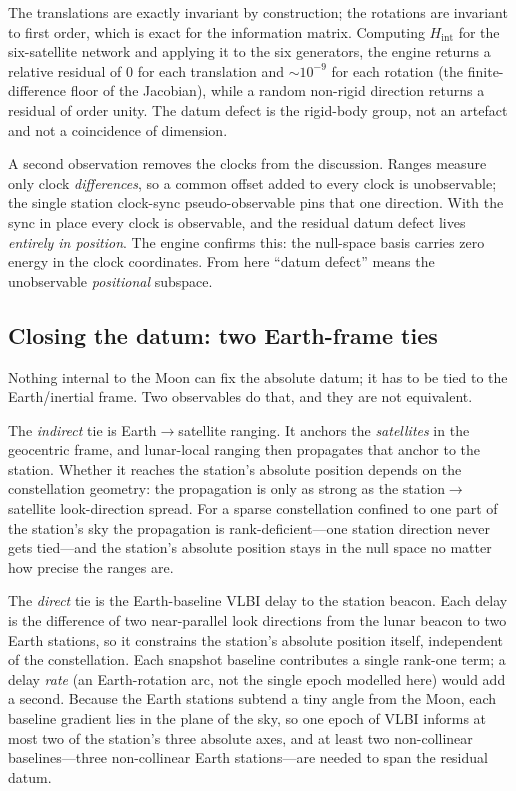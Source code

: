 The translations are exactly invariant by construction; the rotations are invariant
to first order, which is exact for the information matrix. Computing
$H_{\mathrm{int}}$ for the six-satellite network and applying it to the six
generators, the engine returns a relative residual of $0$ for each translation and
$\sim\!10^{-9}$ for each rotation (the finite-difference floor of the Jacobian),
while a random non-rigid direction returns a residual of order unity. The datum
defect is the rigid-body group, not an artefact and not a coincidence of
dimension.

A second observation removes the clocks from the discussion. Ranges measure only
clock \emph{differences}, so a common offset added to every clock is unobservable;
the single station clock-sync pseudo-observable pins that one direction. With the
sync in place every clock is observable, and the residual datum defect lives
\emph{entirely in position}. The engine confirms this: the null-space basis carries
zero energy in the clock coordinates. From here ``datum defect'' means the
unobservable \emph{positional} subspace.

\subsection{Closing the datum: two Earth-frame ties}

Nothing internal to the Moon can fix the absolute datum; it has to be tied to the
Earth/inertial frame. Two observables do that, and they are not equivalent.

The \emph{indirect} tie is Earth$\to$satellite ranging. It anchors the
\emph{satellites} in the geocentric frame, and lunar-local ranging then propagates
that anchor to the station. Whether it reaches the station's absolute position
depends on the constellation geometry: the propagation is only as strong as the
station$\to$satellite look-direction spread. For a sparse constellation confined to
one part of the station's sky the propagation is rank-deficient---one station
direction never gets tied---and the station's absolute position stays in the null
space no matter how precise the ranges are.

The \emph{direct} tie is the Earth-baseline VLBI delay to the station beacon. Each
delay is the difference of two near-parallel look directions from the lunar beacon
to two Earth stations, so it constrains the station's absolute position itself,
independent of the constellation. Each snapshot baseline contributes a single
rank-one term; a delay \emph{rate} (an Earth-rotation arc, not the single epoch
modelled here) would add a second. Because the Earth stations subtend a tiny angle
from the Moon, each baseline gradient lies in the plane of the sky, so one epoch of
VLBI informs at most two of the station's three absolute axes, and at least two
non-collinear baselines---three non-collinear Earth stations---are needed to span
the residual datum.

